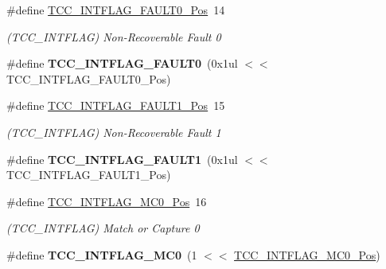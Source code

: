 \begin{DoxyCompactItemize}
\item 
\hypertarget{group___s_a_m_l21___t_c_c_ga73f43ffbcbbd258b0c3e1031d8f16b5c}{}\#define \hyperlink{group___s_a_m_l21___t_c_c_ga73f43ffbcbbd258b0c3e1031d8f16b5c}{T\+C\+C\+\_\+\+I\+N\+T\+F\+L\+A\+G\+\_\+\+F\+A\+U\+L\+T0\+\_\+\+Pos}~14\label{group___s_a_m_l21___t_c_c_ga73f43ffbcbbd258b0c3e1031d8f16b5c}

\begin{DoxyCompactList}\small\item\em (T\+C\+C\+\_\+\+I\+N\+T\+F\+L\+A\+G) Non-\/\+Recoverable Fault 0 \end{DoxyCompactList}\item 
\hypertarget{group___s_a_m_l21___t_c_c_ga443188cee6ce09e66e5ffe395ae2727e}{}\#define {\bfseries T\+C\+C\+\_\+\+I\+N\+T\+F\+L\+A\+G\+\_\+\+F\+A\+U\+L\+T0}~(0x1ul $<$$<$ T\+C\+C\+\_\+\+I\+N\+T\+F\+L\+A\+G\+\_\+\+F\+A\+U\+L\+T0\+\_\+\+Pos)\label{group___s_a_m_l21___t_c_c_ga443188cee6ce09e66e5ffe395ae2727e}

\item 
\hypertarget{group___s_a_m_l21___t_c_c_gac9f78e3a5a38d1c7ef5a089587244036}{}\#define \hyperlink{group___s_a_m_l21___t_c_c_gac9f78e3a5a38d1c7ef5a089587244036}{T\+C\+C\+\_\+\+I\+N\+T\+F\+L\+A\+G\+\_\+\+F\+A\+U\+L\+T1\+\_\+\+Pos}~15\label{group___s_a_m_l21___t_c_c_gac9f78e3a5a38d1c7ef5a089587244036}

\begin{DoxyCompactList}\small\item\em (T\+C\+C\+\_\+\+I\+N\+T\+F\+L\+A\+G) Non-\/\+Recoverable Fault 1 \end{DoxyCompactList}\item 
\hypertarget{group___s_a_m_l21___t_c_c_ga046c813f436dc1baef95d29a0c67c6dd}{}\#define {\bfseries T\+C\+C\+\_\+\+I\+N\+T\+F\+L\+A\+G\+\_\+\+F\+A\+U\+L\+T1}~(0x1ul $<$$<$ T\+C\+C\+\_\+\+I\+N\+T\+F\+L\+A\+G\+\_\+\+F\+A\+U\+L\+T1\+\_\+\+Pos)\label{group___s_a_m_l21___t_c_c_ga046c813f436dc1baef95d29a0c67c6dd}

\item 
\hypertarget{group___s_a_m_l21___t_c_c_ga67f3d6eb27398c5b848df2b8c1750944}{}\#define \hyperlink{group___s_a_m_l21___t_c_c_ga67f3d6eb27398c5b848df2b8c1750944}{T\+C\+C\+\_\+\+I\+N\+T\+F\+L\+A\+G\+\_\+\+M\+C0\+\_\+\+Pos}~16\label{group___s_a_m_l21___t_c_c_ga67f3d6eb27398c5b848df2b8c1750944}

\begin{DoxyCompactList}\small\item\em (T\+C\+C\+\_\+\+I\+N\+T\+F\+L\+A\+G) Match or Capture 0 \end{DoxyCompactList}\item 
\hypertarget{group___s_a_m_l21___t_c_c_ga4e8e5b42b205d65eb4235e40f06a8773}{}\#define {\bfseries T\+C\+C\+\_\+\+I\+N\+T\+F\+L\+A\+G\+\_\+\+M\+C0}~(1 $<$$<$ \hyperlink{group___s_a_m_l21___t_c_c_ga67f3d6eb27398c5b848df2b8c1750944}{T\+C\+C\+\_\+\+I\+N\+T\+F\+L\+A\+G\+\_\+\+M\+C0\+\_\+\+Pos})\label{group___s_a_m_l21___t_c_c_ga4e8e5b42b205d65eb4235e40f06a8773}


\end{DoxyCompactItemize}
